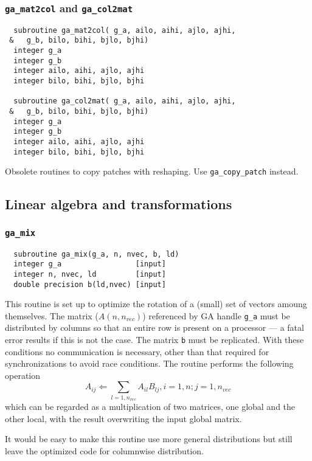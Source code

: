 \subsubsection{{\tt ga\_mat2col} and {\tt ga\_col2mat}}
\begin{verbatim}
  subroutine ga_mat2col( g_a, ailo, aihi, ajlo, ajhi,
 &   g_b, bilo, bihi, bjlo, bjhi)
  integer g_a
  integer g_b
  integer ailo, aihi, ajlo, ajhi
  integer bilo, bihi, bjlo, bjhi

  subroutine ga_col2mat( g_a, ailo, aihi, ajlo, ajhi,
 &   g_b, bilo, bihi, bjlo, bjhi)
  integer g_a
  integer g_b
  integer ailo, aihi, ajlo, ajhi
  integer bilo, bihi, bjlo, bjhi
\end{verbatim}
Obsolete routines to copy patches with reshaping. Use \verb+ga_copy_patch+
instead.

\subsection{Linear algebra and transformations}

\subsubsection{{\tt ga\_mix}}
\begin{verbatim}
  subroutine ga_mix(g_a, n, nvec, b, ld)
  integer g_a                 [input]
  integer n, nvec, ld         [input]
  double precision b(ld,nvec) [input]
\end{verbatim}
This routine is set up to optimize the rotation of a (small) set of
vectors amoung themselves.  The matrix ($A(n,n_{vec})$) referenced by
GA handle \verb+g_a+ must be distributed by columns so that an entire
row is present on a processor --- a fatal error results if this is not
the case.  The matrix {\tt b} must be replicated.  With these
conditions no communication is necessary, other than that required for
synchronizations to avoid race conditions.  The routine performs the
following operation
\begin{displaymath}
     A_{ij} \Leftarrow \sum_{l=1,n_{vec}} A_{il} B_{lj}, i=1,n; j=1,n_{vec}
\end{displaymath}
which can be regarded as a multiplication of two matrices, one global
and the other local, with the result overwriting the input global
matrix.

It would be easy to make this routine use more general distributions
but still leave the optimized code for columnwise distribution.

